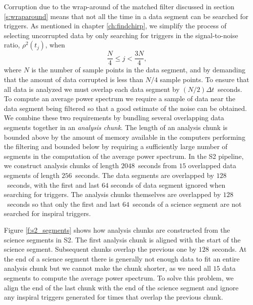 Corruption due to the wrap-around of the matched filter discussed in section
\ref{s:wraparound} means that not all the time in a data segment can be
searched for triggers. As mentioned in chapter \ref{ch:findchirp}, we simplify
the process of selecting uncorrupted data by only searching for triggers in
the signal-to-noise ratio, $\rho^2(t_j)$, when 
\begin{equation}
\frac{N}{4} \le j < \frac{3N}{4},
\end{equation}
where $N$ is the number of sample points in the data segment, and by demanding
that the amount of data corrupted is less than $N/4$ sample points. To ensure
that all data is analyzed we must overlap each data segment by $(N/2)\Delta 
t$~seconds. To compute an average power spectrum we require a sample of data
near the data segment being filtered so that a good estimate of the noise can
be obtained. We combine these two requirements by bundling several overlapping
data segments together in an \emph{analysis chunk}. The length of an analysis
chunk is bounded above by the amount of memory available in the computers
performing the filtering and bounded below by requiring a sufficiently large
number of segments in the computation of the average power spectrum. In the S2
pipeline, we construct analysis chunks of length $2048$~seconds from $15$
overlapped data segments of length $256$~seconds. The data segments are
overlapped by $128$~seconds, with the first and last $64$ seconds of data
segment ignored when searching for triggers. The analysis chunks themselves
are overlapped by $128$~seconds so that only the first and last $64$~seconds
of a science segment are not searched for inspiral triggers.

Figure \ref{f:s2_segments} shows how analysis chunks are constructed from the
science segments in S2. The first analysis chunk is aligned with the start of
the science segment. Subsequent chunks overlap the previous one by
$128$~seconds. At the end of a science segment there is generally not enough
data to fit an entire analysis chunk but we cannot make the chunk shorter, as
we need all $15$ data segments to compute the average power spectrum. To solve
this problem, we align the end of the last chunk with the end of the science
segment and ignore any inspiral triggers generated for times that overlap the
previous chunk. 

